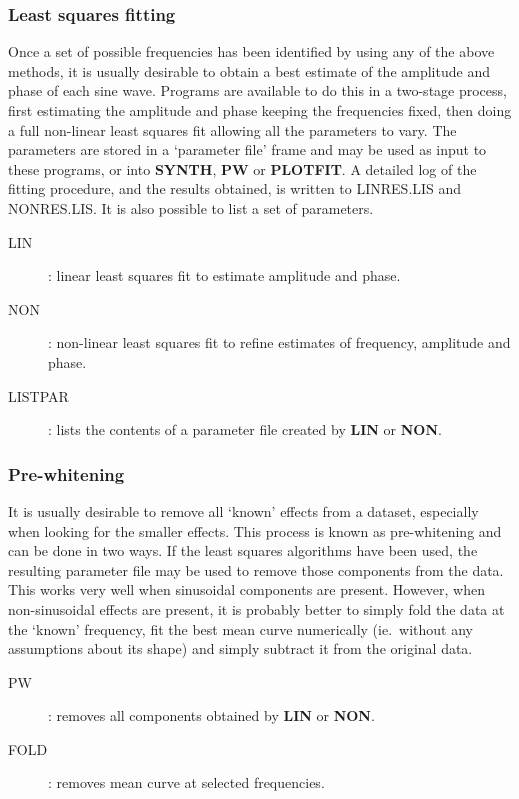 \subsubsection {Least squares fitting}
Once a set of possible frequencies has been identified by using any of the above
methods, it is usually desirable to obtain a best estimate of the amplitude and
phase of each sine wave.
Programs are available to do this in a two-stage process, first estimating the
amplitude and phase keeping the frequencies fixed, then doing a full non-linear
least squares fit allowing all the parameters to vary.
The parameters are stored in a `parameter file' frame and may be used as input
to these programs, or into {\bf SYNTH}, {\bf PW} or {\bf PLOTFIT}.
A detailed log of the fitting procedure, and the results obtained, is written to
LINRES.LIS and NONRES.LIS.
It is also possible to list a set of parameters.
\begin{description}
\item [LIN]: linear least squares fit to estimate amplitude and phase.
\item [NON]: non-linear least squares fit to refine estimates of frequency,
amplitude and phase.
\item [LISTPAR]: lists the contents of a parameter file created by {\bf LIN}
or {\bf NON}.
\end{description}
\subsubsection {Pre-whitening}
It is usually desirable to remove all `known' effects from a dataset, especially
when looking for the smaller effects.
This process is known as pre-whitening and can be done in two ways.
If the least squares algorithms have been used, the resulting parameter file
may be used to remove those components from the data.
This works very well when sinusoidal components are present.
However, when non-sinusoidal effects are present, it is probably better to
simply fold the data at the `known' frequency, fit the best mean curve
numerically (ie.\ without any assumptions about its shape) and simply subtract
it from the original data.
\begin{description}
\item [PW]: removes all components obtained by {\bf LIN} or {\bf NON}.
\item [FOLD]: removes mean curve at selected frequencies.
\end{description}
